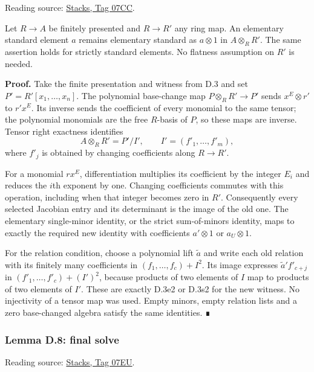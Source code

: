 \documentclass[11pt,a4paper,openany]{report}
\begin{document}
Reading source: \href{https://stacks.math.columbia.edu/tag/07CC}{Stacks, Tag 07CC}.

Let \(R\to A\) be finitely presented and \(R\to R'\) any ring map. An elementary standard element \(a\) remains elementary standard as \(a\otimes1\) in \(A\otimes_R R'\). The same assertion holds for strictly standard elements. No flatness assumption on \(R'\) is needed.

\textbf{Proof.} Take the finite presentation and witness from D.3 and set \(P'=R'[x_1,\ldots,x_n]\). The polynomial base-change map \(P\otimes_R R'\to P'\) sends \(x^E\otimes r'\) to \(r'x^E\). Its inverse sends the coefficient of every monomial to the same tensor; the polynomial monomials are the free \(R\)-basis of \(P\), so these maps are inverse. Tensor right exactness identifies \[A\otimes_R R'=P'/I',\qquad I'=(f'_1,\ldots,f'_m),\] where \(f'_j\) is obtained by changing coefficients along \(R\to R'\).

For a monomial \(r x^E\), differentiation multiplies its coefficient by the integer \(E_i\) and reduces the \(i\)th exponent by one. Changing coefficients commutes with this operation, including when that integer becomes zero in \(R'\). Consequently every selected Jacobian entry and its determinant is the image of the old one. The elementary single-minor identity, or the strict sum-of-minors identity, maps to exactly the required new identity with coefficients \(a'\otimes1\) or \(a_U\otimes1\).

For the relation condition, choose a polynomial lift \(\widetilde a\) and write each old relation with its finitely many coefficients in \((f_1,\ldots,f_c)+I^2\). Its image expresses \(\widetilde a' f'_{c+j}\) in \((f'_1,\ldots,f'_c)+(I')^2\), because products of two elements of \(I\) map to products of two elements of \(I'\). These are exactly D.3e2 or D.3s2 for the new witness. No injectivity of a tensor map was used. Empty minors, empty relation lists and a zero base-changed algebra satisfy the same identities. ∎

\label{AG-RG-S05-smoothing-lemma-final-solve}

\subsubsection{Lemma D.8: final solve}\label{AG-RG-S05-lemma-d.8-final-solve}

Reading source: \href{https://stacks.math.columbia.edu/tag/07EU}{Stacks, Tag 07EU}.
\end{document}
